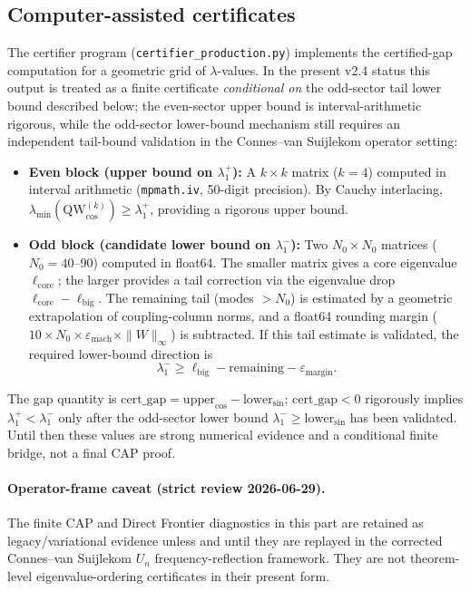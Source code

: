 \documentclass[12pt,a4paper]{article}
\theoremstyle{definition}
\theoremstyle{remark}
\begin{document}
\subsection{Computer-assisted certificates}
\label{sec:certificates}

The certifier program (\texttt{certifier\_production.py}) implements the certified-gap computation for a geometric grid of $\lambda$-values. In the present v2.4 status this output is treated as a finite certificate \emph{conditional on} the odd-sector tail lower bound described below; the even-sector upper bound is interval-arithmetic rigorous, while the odd-sector lower-bound mechanism still requires an independent tail-bound validation in the Connes--van Suijlekom operator setting:
\begin{itemize}
  \item \textbf{Even block (upper bound on $\lambda_1^+$):} A $k \times k$ matrix ($k = 4$) computed in interval arithmetic (\texttt{mpmath.iv}, 50-digit precision). By Cauchy interlacing, $\lambda_{\min}(\mathrm{QW}_{\cos}^{(k)}) \geq \lambda_1^+$, providing a rigorous upper bound.
  \item \textbf{Odd block (candidate lower bound on $\lambda_1^-$):} Two $N_0 \times N_0$ matrices ($N_0 = 40$--$90$) computed in float64. The smaller matrix gives a core eigenvalue $\ell_{\mathrm{core}}$; the larger provides a tail correction via the eigenvalue drop $\ell_{\mathrm{core}} - \ell_{\mathrm{big}}$. The remaining tail (modes $> N_0$) is estimated by a geometric extrapolation of coupling-column norms, and a float64 rounding margin ($10 \times N_0 \times \varepsilon_{\mathrm{mach}} \times \|W\|_\infty$) is subtracted. If this tail estimate is validated, the required lower-bound direction is
  \[
    \lambda_1^- \geq \ell_{\mathrm{big}} - \mathrm{remaining} - \varepsilon_{\mathrm{margin}}.
  \]
\end{itemize}
The gap quantity is $\mathrm{cert\_gap} = \mathrm{upper}_{\cos} - \mathrm{lower}_{\sin}$; $\mathrm{cert\_gap} < 0$ rigorously implies $\lambda_1^+ < \lambda_1^-$ only after the odd-sector lower bound $\lambda_1^- \geq \mathrm{lower}_{\sin}$ has been validated. Until then these values are strong numerical evidence and a conditional finite bridge, not a final CAP proof.

\paragraph{Operator-frame caveat (strict review 2026-06-29).}
The finite CAP and Direct Frontier diagnostics in this part are retained as
legacy/variational evidence unless and until they are replayed in the corrected
Connes--van Suijlekom $U_n$ frequency-reflection framework. They are not
theorem-level eigenvalue-ordering certificates in their present form.
\end{document}
